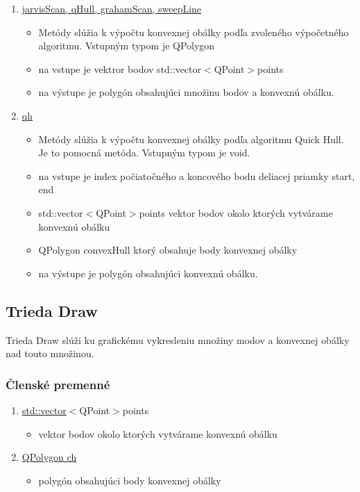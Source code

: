 \documentclass[12pt]{article}
\begin{document}
\begin{enumerate}
\item[] \underline{jarvisScan, qHull, grahamScan, sweepLine}
\begin{itemize}
\item Metódy slúžia k výpočtu konvexnej obálky podľa zvoleného výpočetného algoritmu. Vstupným typom je QPolygon
\item na vstupe je vektror bodov {std::vector}$<${QPoint}$>${points}
\item na výstupe je polygón obsahujúci množinu bodov a konvexnú obálku.
\end{itemize}

\item[] \underline{qh}
\begin{itemize}
\item Metódy slúžia k výpočtu konvexnej obálky podľa algoritmu Quick Hull. Je to pomocná metóda. Vstupným typom je void.
\item na vstupe je index počiatočného a koncového bodu deliacej priamky start, end
\item {std::vector}$<${QPoint}$>${points} vektor bodov okolo ktorých vytvárame konvexnú obálku
\item QPolygon  convexHull ktorý obsahuje body konvexnej obálky
\item na výstupe je polygón obsahujúci konvexnú obálku.
\end{itemize}

\end{enumerate}

\subsection{Trieda Draw}
Trieda Draw slúži ku grafickému vykresleniu množiny modov a konvexnej obálky nad touto množinou.

\subsubsection{Členské premenné}
\begin{enumerate}

\item[] \underline {std::vector}$<${QPoint}$>${points}
\begin{itemize}
\item vektor bodov okolo ktorých vytvárame konvexnú obálku
\end{itemize}
\item[] \underline {QPolygon ch}
\begin{itemize}
\item polygón obsahujúci body konvexnej obálky
\end{itemize}
\end{enumerate}
\end{document}
